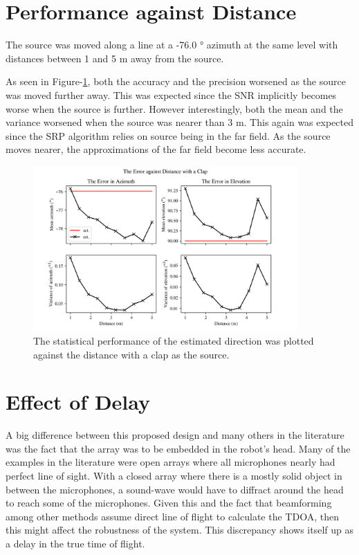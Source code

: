 \documentclass[notitlepage]{report}
\begin{document}
\section{Performance against Distance}

The source was moved along a line at a -76.0 \si{\degree} azimuth at the same level with distances between 1 and 5 \si{m} away from the source.

As seen in Figure-\ref{fig:mm_distance_plots_clap}, both the accuracy and the precision worsened as the source was moved further away. This was expected since the SNR implicitly becomes worse when the source is further. However interestingly, both the mean and the variance worsened when the source was nearer than 3 \si{m}. This again was expected since the SRP algorithm relies on source being in the far field. As the source moves nearer, the approximations of the far field become less accurate.

\begin{figure}[H]
\includegraphics[width=0.9\textwidth]{../Python/main_method/distance/plots.png}
\centering
\caption{The statistical performance of the estimated direction was plotted against the distance with a clap as the source.}
\label{fig:mm_distance_plots_clap}
\centering
\end{figure}

\section{Effect of Delay} \label{Effect_of_Delay}

A big difference between this proposed design and many others in the literature was the fact that the array was to be embedded in the robot's head. Many of the examples in the literature were open arrays where all microphones nearly had perfect line of sight. With a closed array where there is a mostly solid object in between the microphones, a sound-wave would have to diffract around the head to reach some of the microphones. Given this and the fact that beamforming among other methods assume direct line of flight to calculate the TDOA, then this might affect the robustness of the system. This discrepancy shows itself up as a delay in the true time of flight.
\end{document}
